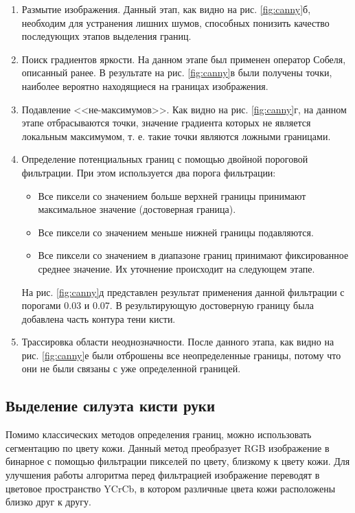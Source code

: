 \begin{enumerate}
	\item Размытие изображения. Данный этап, как видно на рис. \ref{fig:canny}б, необходим для устранения лишних шумов, способных понизить качество последующих	этапов выделения границ.
	\item Поиск градиентов яркости. На данном этапе был применен оператор Собеля, описанный ранее. В результате на рис. \ref{fig:canny}в были получены точки, наиболее вероятно находящиеся на границах изображения\cite{Suharjito}.
	\item Подавление <<не-максимумов>>. Как видно на рис. \ref{fig:canny}г, на данном этапе отбрасываются точки, значение градиента которых не является локальным максимумом, т. е. такие точки являются ложными границами.
	\item Определение потенциальных границ с помощью двойной пороговой фильтрации. При этом используется два порога фильтрации:
	\begin{itemize}
		\item Все пиксели со значением больше верхней границы принимают максимальное значение (достоверная граница).
		\item Все пиксели со значением меньше нижней границы подавляются.
		\item Все пиксели со значением в диапазоне границ принимают фиксированное среднее значение. Их уточнение происходит на следующем этапе.
	\end{itemize}
	На рис. \ref{fig:canny}д представлен результат применения данной фильтрации с порогами 0.03 и 0.07. В результирующую достоверную границу была добавлена часть контура тени кисти.
	\item Трассировка области неоднозначности. После данного этапа, как видно на рис. \ref{fig:canny}е были отброшены все неопределенные границы, потому что они не были связаны с уже определенной границей.
\end{enumerate}

\subsection{Выделение силуэта кисти руки}
\label{cha:syl}
Помимо классических методов определения границ, можно использовать сегментацию по цвету кожи\cite{Phung}. Данный метод преобразует RGB изображение в бинарное с помощью фильтрации пикселей по цвету, близкому к цвету кожи. Для улучшения работы алгоритма перед фильтрацией изображение переводят в цветовое пространство YCrCb, в котором различные цвета кожи расположены близко друг к другу\cite{Siddharth}.

